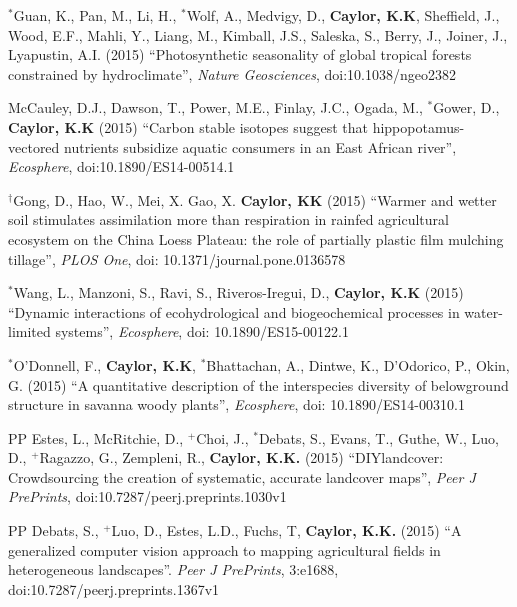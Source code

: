 \documentclass[10pt]{report}
\begin{document}
\begin{etaremune}
\item $^{*}$Guan, K., Pan, M., Li, H.,  $^{*}$Wolf, A., Medvigy, D.,  \textbf{Caylor, K.K}, Sheffield, J., Wood, E.F., Mahli, Y., Liang, M., Kimball, J.S., Saleska, S., Berry, J., Joiner, J., Lyapustin, A.I. (2015) ``Photosynthetic seasonality of global tropical forests constrained by hydroclimate'', {\em Nature Geosciences}, doi:10.1038/ngeo2382

\item McCauley, D.J., Dawson, T., Power, M.E., Finlay, J.C., Ogada, M., $^{*}$Gower, D.,  \textbf{Caylor, K.K} (2015) ``Carbon stable isotopes suggest that hippopotamus-vectored nutrients subsidize aquatic consumers in an East African river'', {\em Ecosphere}, doi:10.1890/ES14-00514.1

\item $^{\dagger}$Gong, D., Hao, W., Mei, X. Gao, X. \textbf{Caylor, KK} (2015) ``Warmer and wetter soil stimulates assimilation more than respiration in rainfed agricultural ecosystem on the China Loess Plateau: the role of partially plastic film mulching tillage'', {\em PLOS One}, doi: 10.1371/journal.pone.0136578

\item $^{*}$Wang, L., Manzoni, S., Ravi, S., Riveros-Iregui, D., \textbf{Caylor, K.K} (2015) ``Dynamic interactions of ecohydrological and biogeochemical processes in water-limited systems'', {\em Ecosphere}, doi: 10.1890/ES15-00122.1

\item $^{*}$O'Donnell, F., \textbf{Caylor, K.K}, $^{*}$Bhattachan, A., Dintwe, K., D'Odorico, P., Okin, G. (2015) ``A quantitative description of the interspecies diversity of belowground structure in savanna woody plants'', {\em Ecosphere}, doi: 10.1890/ES14-00310.1

\item [PP] Estes, L., McRitchie, D., $^{+}$Choi, J., $^{*}$Debats, S.,  Evans, T., Guthe, W., Luo, D., $^{+}$Ragazzo, G., Zempleni, R., \textbf{Caylor, K.K.} (2015) ``DIYlandcover: Crowdsourcing the creation of systematic, accurate landcover maps'', {\em Peer J PrePrints}, doi:10.7287/peerj.preprints.1030v1

\item [PP] Debats, S., $^{+}$Luo, D., Estes, L.D., Fuchs, T, \textbf{Caylor, K.K.} (2015) ``A generalized computer vision approach to mapping agricultural fields in heterogeneous landscapes''. {\em Peer J PrePrints}, 3:e1688, \\ doi:10.7287/peerj.preprints.1367v1
 

\end{etaremune}
\end{document}
